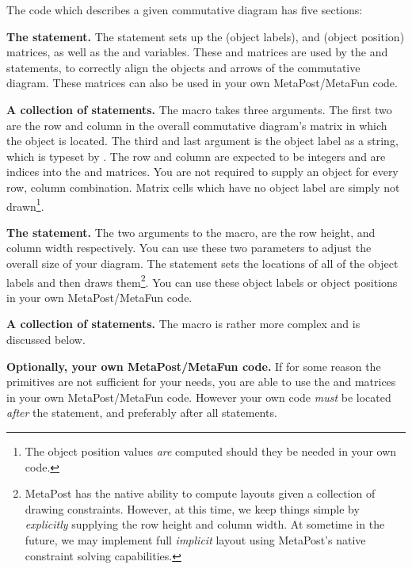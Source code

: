 The  code which describes a given commutative diagram has 
five sections: 

\startitemize[n]

\item {\bf The  statement.} The  
statement sets up the  (object labels), and  
(object position) matrices, as well as the  and 
 variables. These  and  matrices 
are used by the  and  statements, to 
correctly align the objects and arrows of the commutative diagram. These 
matrices can also be used in your own MetaPost/MetaFun code. 

\item {\bf A collection of  statements.} The 
 macro takes three arguments. The first two are the row 
and column in the overall commutative diagram's matrix in which the object 
is located. The third and last argument is the object label as a string, 
which is typeset by \ConTeXt. The row and column are expected to be 
integers and are indices into the  and  
matrices. You are not required to supply an object for every row, column 
combination. Matrix cells which have no object label are simply not 
drawn\footnote{The object position values \emph{are} computed should they 
be needed in your own code.}. 

\item {\bf The  statement.} The two arguments to the 
 macro, are the row height, and column width 
respectively. You can use these two parameters to adjust the overall size 
of your diagram. The  statement sets the locations of 
all of the object labels and then draws them\footnote{MetaPost has the 
native ability to compute layouts given a collection of drawing 
constraints. However, at this time, we keep things simple by 
\emph{explicitly} supplying the row height and column width. At sometime 
in the future, we may implement full \emph{implicit} layout using 
MetaPost's native constraint solving capabilities.}. You can use these 
object labels or object positions in your own MetaPost/MetaFun code. 

\item {\bf A collection of  statements.} The 
 macro is rather more complex and is discussed below. 

\item {\bf Optionally, your own MetaPost/MetaFun code.} If for some reason 
the  primitives are not sufficient for your needs, you 
are able to use the  and  matrices in your own 
MetaPost/MetaFun code. However your own code \emph{must} be located 
\emph{after} the  statement, and preferably after all 
 statements. 

